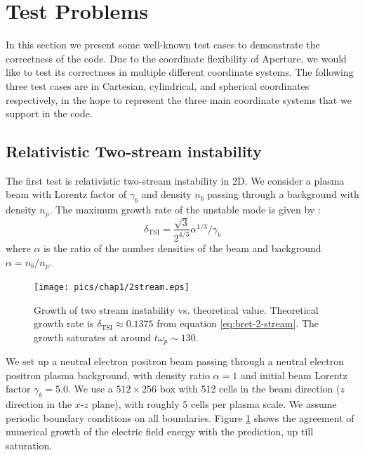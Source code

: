 \section{Test Problems}
\label{sec:test-problems}

In this section we present some well-known test cases to demonstrate the
correctness of the code. Due to the coordinate flexibility of Aperture, we would
like to test its correctness in multiple different coordinate systems. The
following three test cases are in Cartesian, cylindrical, and spherical
coordinates respectively, in the hope to represent the three main coordinate
systems that we support in the code.

\subsection{Relativistic Two-stream instability}
\label{sec:test-two-stream}

The first test is relativistic two-stream instability in 2D. We consider a
plasma beam with Lorentz factor of $\gamma_{b}$ and density $n_{b}$ passing
through a background with density $n_{p}$. The maximum growth rate of the
unstable mode is given by \citep[see e.g.][]{bret_collective_2004}:
\begin{equation}
  \label{eq:bret-2-stream}
  \delta_\mathrm{TSI} = \frac{\sqrt{3}}{2^{4/3}}\alpha^{1/3}/\gamma_{b}
\end{equation}
where $\alpha$ is the ratio of the number densities of the beam and background
$\alpha = n_{b}/n_{p}$.

\begin{figure}[h]
  \centering
  \texttt{[image: pics/chap1/2stream.eps]}
  \caption[Growth of two stream instability vs. theoretical value.]{Growth of
    two stream instability vs. theoretical value. Theoretical growth rate is
    $\delta_\mathrm{TSI}\approx 0.1375$ from equation \eqref{eq:bret-2-stream}.
    The growth saturates at around $t\omega_{p}\sim 130$.}
  \label{fig:test-2stream}
\end{figure}

We set up a neutral electron positron beam passing through a neutral electron
positron plasma background, with density ratio $\alpha = 1$ and initial beam
Lorentz factor $\gamma_{b} = 5.0$. We use a $512\times 256$ box with 512 cells
in the beam direction ($z$ direction in the $x$-$z$ plane), with roughly 5 cells
per plasma scale. We assume periodic boundary conditions on all boundaries.
Figure \ref{fig:test-2stream} shows the agreement of numerical growth of the
electric field energy with the prediction, up till saturation.

